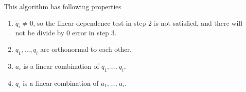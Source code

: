 \documentclass{article}
\begin{document}
This algorithm has following properties
\begin{enumerate}
    \item $\tilde{q}_i \ne 0$, so the linear dependence test in step 2 is not satisfied, and there will not be divide by 0 error in step 3.
    \item $q_1,...,q_i$ are orthonormal to each other.
    \item $a_i$ is a linear combination of $q_1,...,q_i$.
    \item $q_i$ is a linear combination of $a_1,...,a_i$.
\end{enumerate}
\end{document}
